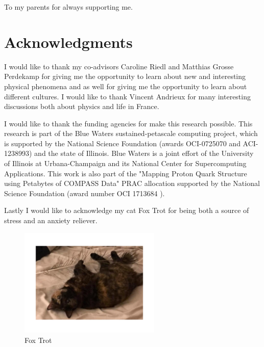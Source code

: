 \documentclass[edeposit,fullpage]{Classes/uiucthesis2009}
\begin{document}
\begin{dedication}
To my parents for always supporting me.
\end{dedication}

\chapter*{Acknowledgments}
I would like to thank my co-advisors Caroline Riedl and Matthias Grosse
Perdekamp for giving me the opportunity to learn about new and interesting
physical phenomena and as well for giving me the opportunity to learn about
different cultures.  I would like to thank Vincent Andrieux for many interesting
discussions both about physics and life in France.

I would like to thank the funding agencies for make this research possible.
This research is part of the Blue Waters sustained-petascale
computing project, which is supported by the National Science
Foundation (awards OCI-0725070 and ACI-1238993) and the state of
Illinois. Blue Waters is a joint effort of the University of Illinois
at Urbana-Champaign and its National Center for Supercomputing
Applications. This work is also part of the "Mapping Proton Quark
Structure using Petabytes of COMPASS Data" PRAC allocation supported
by the National Science Foundation (award number OCI 1713684 ).

Lastly I would like to acknowledge my cat Fox Trot for being both a source of 
stress and an anxiety reliever.
\begin{figure}[h!t]
  \centering
  \includegraphics[width=0.6\textwidth,trim=2cm 4cm 2cm 4cm,clip]{fox}
  \caption*{Fox Trot}
  \label{fig::fox}
\end{figure}


\tableofcontents
\listoftables
\listoffigures
\end{document}
